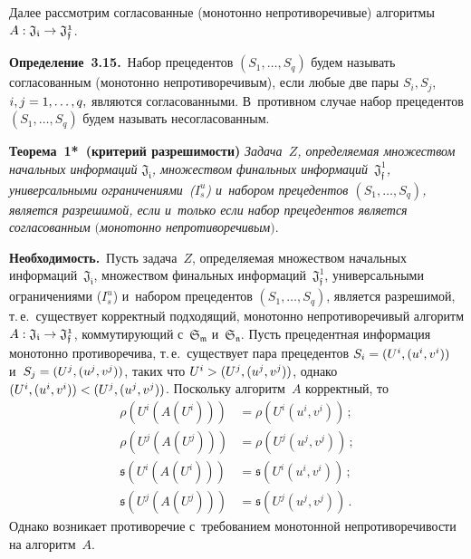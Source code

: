 \begin{multicols}{2}
\smallskip

Далее рассмотрим согласованные (монотонно непротиворечивые) алгоритмы 
$A:\mathfrak{J_i} \hm\rightarrow \mathfrak{J_f^1}$.

\smallskip

\noindent
\textbf{Определение~3.15.}\
Набор прецедентов $(S_1,\ldots,S_q)$ будем называть согласованным (монотонно 
непротиворечивым), если любые две пары $S_i, S_j$, $i,j\hm=1,\ldots,q,$ являются 
согласованными. В~противном случае набор прецедентов $(S_1,\ldots,S_q)$ будем 
называть несогласованным.

\smallskip

\noindent
\textbf{Теорема~1*\ (критерий разрешимости)} \textit{Задача~$Z$, определяемая 
множеством начальных информаций $\mathfrak{J_i}$, множеством финальных 
информаций~$\mathfrak{J_{f}^1}$, универсальными ограничениями~($I_s^u$) 
и~набором прецедентов  $(S_1,\ldots,S_q)$, является разрешимой, если и~только если 
набор прецедентов является согласованным $($монотонно непротиворечивым$)$}.

\smallskip

\noindent
\textbf{Необходимость.}\ Пусть задача~$Z$, определяемая множеством 
начальных информаций~$\mathfrak{J_i}$, множеством финальных 
информаций~$\mathfrak{J_{f}^1}$, универсальными ограничениями ($I_s^u$) и~набором 
прецедентов  $(S_1,\ldots,S_q)$, является разрешимой, т.\,е.\ существует корректный 
подходящий, монотонно непротиворечивый алгоритм $A: \mathfrak{J_i} \hm\rightarrow 
\mathfrak{J_f^1}$, коммутирующий с~$\mathfrak{S_m}$ и~$\mathfrak{S_n}$. Пусть 
прецедентная информация монотонно противоречива, т.\,е.\ существует пара 
прецедентов $S_i\hm = (U^i, (u^i,v^i))$ и~$S_j\hm=(U^j, (u^j,v^j))$, таких что $U^i\hm > 
(U^j, (u^j,v^j))$, однако $(U^i, (u^i,v^i))\hm< (U^j, (u^j,v^j))$. Поскольку 
алгоритм~$A$ корректный, то 
\begin{align*}
\rho\left(U^i\left(A\left(U^i\right)\right)\right)&= \rho\left(U^i\left(u^i, v^i\right)\right)\,;\\ 
\rho\left(U^j\left(A(U^j)\right)\right)&= \rho\left(U^j\left(u^j, v^j\right)\right)\,;\\ 
\mathfrak{s}\left(U^i\left(A\left(U^i\right)\right)\right)&=
\mathfrak{s}\left(U^i\left(u^i, v^i\right)\right)\,;\\ 
\mathfrak{s}\left(U^j\left(A\left(U^j\right)\right)\right)&= 
\mathfrak{s}\left(U^j\left(u^j, v^j\right)\right)\,.
\end{align*}
 Однако возникает противоречие с~требованием 
монотонной непротиворечивости на алгоритм~$A$.


\end{multicols}
